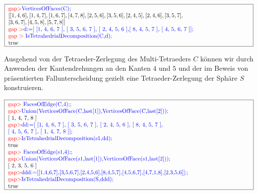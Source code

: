 \documentclass[12pt,titlepage,twoside,cleardoublepage]{article}
\theoremstyle{nummermitklammern}
\numberwithin{equation}{section}
\begin{document}
\begin{center}
 $\fbox{
\parbox{15cm}{
\textcolor{red}{gap$>$}\textcolor{blue}{ VerticesOfFaces(C);}\newline 
$[ [ 1, 4, 6 ], [ 1, 4, 7 ], [ 1, 6, 7 ], [ 4, 7, 8 ], [ 2, 5, 6 ],
[ 3, 5, 6 ],[ 2, 4, 5 ], [ 2, 4, 6 ], [ 3, 5, 7 ],$ \newline
$  [ 3, 6, 7 ],
[ 4, 5, 8 ], [ 5, 7, 8 ] ]$\newline
\textcolor{red}{gap $>$}\textcolor{blue}{d:=[ [1, 4, 6, 7 ], [ 3, 5, 6, 7 ], [ 2, 4, 5, 6 ],[ 8, 4, 5, 7 ], [ 4, 5, 6, 7 ]];}\newline
\textcolor{red}{gap $>$} \textcolor{blue}{IsTetrahedrialDecomposition(C,d);}\newline
true
 }}$
 \end{center}
 Ausgehend von der Tetraeder-Zerlegung des Multi-Tetraeders $C$ können wir durch Anwenden der Kantendrehungen an den Kanten $4$ und $5$ und der im Beweis von  präsentierten Fallunterscheidung gezielt eine Tetraeder-Zerlegung der Sphäre $S$ konstruieren.
 \begin{center}
 $\fbox{
\parbox{15cm}{
\textcolor{red}{gap$>$} \textcolor{blue}{FacesOfEdge(C,4);;}\newline 
\textcolor{red}{gap$>$}\textcolor{blue}{Union(VerticesOfFace(C,last[1]),VerticesOfFace(C,last[2]));}
\newline
 [ 1, 4, 7, 8 ]\newline 
\textcolor{red}{gap$>$}\textcolor{blue}{dd:=[ [1, 4, 6, 7 ], [ 3, 5, 6, 7 ], [ 2, 4, 5, 6 ], [ 8, 4, 5, 7 ],$ \newline $ [ 4, 5, 6, 7 ], [ 1,
4, 7, 8 ]];}\newline 
\textcolor{red}{gap$>$}\textcolor{blue}{ IsTetrahedrialDecomposition(s1,dd);}\newline 
true\newline 
\textcolor{red}{gap$>$} \textcolor{blue}{FacesOfEdge(s1,4);;}\newline 
\textcolor{red}{gap$>$}\textcolor{blue}{Union(VerticesOfFace(s1,last[1]),VerticesOfFace(s1,last[2]));}
\newline [ 2, 3, 5, 6 ]\newline 
\textcolor{red}{gap$>$}\textcolor{blue}{ddd:=[[1,4,6,7],[3,5,6,7],[2,4,5,6],[8,4,5,7],[4,5,6,7],[4,7,1,8],[2,3,5,6]];;}\newline 
\textcolor{red}{gap$>$}\textcolor{blue}{IsTetrahedrialDecomposition(S,ddd);}\newline 
true
 }}$
 \end{center}
\end{document}
